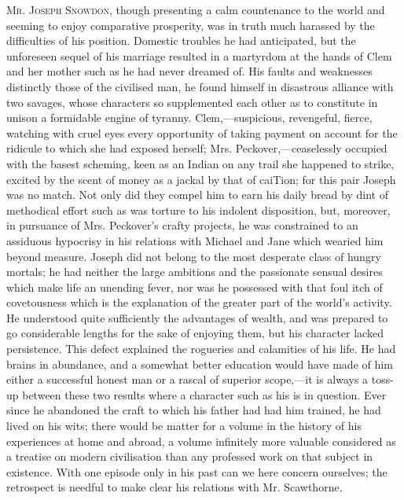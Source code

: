 \textsc{Mr. Joseph Snowdon}, though presenting a calm countenance to the
world and seeming to enjoy comparative prosperity, was in truth much
harassed by the difficulties of his position. Domestic troubles he had
anticipated, but the unforeseen sequel of his marriage resulted in a
martyrdom at the hands of Clem and her mother such as he had never
dreamed of. His faults and weaknesses distinctly those of the civilised
man, he found himself in disastrous alliance with two savages, whose
characters so supplemented each other as to constitute in unison a
formidable engine of tyranny. Clem,---suspicious, revengeful, fierce,
watching with cruel eyes every opportunity of taking payment on account
for the ridicule to which she had exposed herself;
{\protect\hypertarget{175}{}{}}Mrs. Peckover,---ceaselessly occupied
with the basest scheming, keen as an Indian on any trail she happened to
strike, excited by the scent of money as a jackal by that of caiTion;
for this pair Joseph was no match. Not only did they compel him to earn
his daily bread by dint of methodical effort such as was torture to his
indolent disposition, but, moreover, in pursuance of Mrs. Peckover's
crafty projects, he was constrained to an assiduous hypocrisy in his
relations with Michael and Jane which wearied him beyond measure. Joseph
did not belong to the most desperate class of hungry mortals; he had
neither the large ambitions and the passionate sensual desires which
make life an unending fever, nor was he possessed with that foul itch of
covetousness which is the explanation of the greater part of the world's
activity. He understood quite sufficiently the advantages of wealth, and
was prepared to go considerable lengths for the sake of enjoying them,
but his character lacked persistence. This defect explained the
rogueries and calamities of his {\protect\hypertarget{176}{}{}}life. He
had brains in abundance, and a somewhat better education would have made
of him either a successful honest man or a rascal of superior
scope,---it is always a toss-up between these two results where a
character such as his is in question. Ever since he abandoned the craft
to which his father had had him trained, he had lived on his wits; there
would be matter for a volume in the history of his experiences at home
and abroad, a volume infinitely more valuable considered as a treatise
on modern civilisation than any professed work on that subject in
existence. With one episode only in his past can we here concern
ourselves; the retrospect is needful to make clear his relations with
Mr. Scawthorne.

